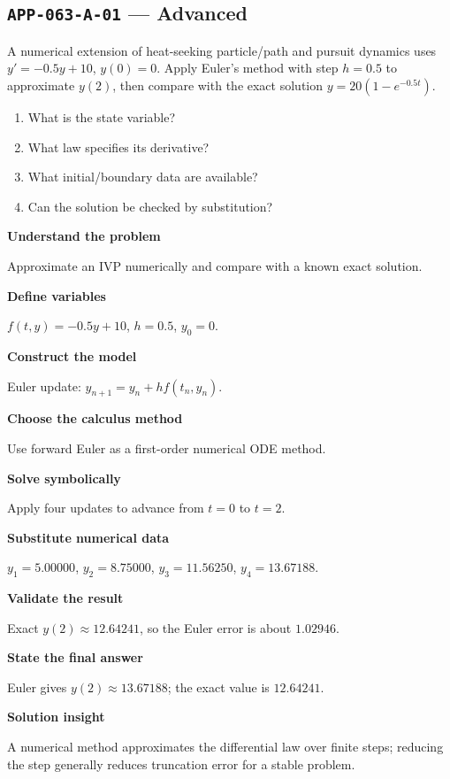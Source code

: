 \documentclass[11pt]{book}
\newcommand{\pid}[1]{\texttt{#1}}
\begin{document}
\subsection*{\pid{APP-063-A-01} — Advanced}
\begin{problembox}
A numerical extension of heat-seeking particle/path and pursuit dynamics uses $y'=-0.5y+10$, $y(0)=0$. Apply Euler's method with step $h=0.5$ to approximate $y(2)$, then compare with the exact solution $y=20(1-e^{-0.5t})$.
\end{problembox}
\begin{promptbox}\begin{enumerate}
\item What is the state variable?
\item What law specifies its derivative?
\item What initial/boundary data are available?
\item Can the solution be checked by substitution?
\end{enumerate}\end{promptbox}
\begin{solutionbox}
\textbf{Understand the problem}\par Approximate an IVP numerically and compare with a known exact solution.\par\medskip
\textbf{Define variables}\par $f(t,y)=-0.5y+10$, $h=0.5$, $y_0=0$.\par\medskip
\textbf{Construct the model}\par Euler update: $y_{n+1}=y_n+h f(t_n,y_n)$.\par\medskip
\textbf{Choose the calculus method}\par Use forward Euler as a first-order numerical ODE method.\par\medskip
\textbf{Solve symbolically}\par Apply four updates to advance from $t=0$ to $t=2$.\par\medskip
\textbf{Substitute numerical data}\par $y_1=5.00000$, $y_2=8.75000$, $y_3=11.56250$, $y_4=13.67188$.\par\medskip
\textbf{Validate the result}\par Exact $y(2)\approx 12.64241$, so the Euler error is about $1.02946$.\par\medskip
\textbf{State the final answer}\par Euler gives $y(2)\approx 13.67188$; the exact value is $12.64241$.\par\medskip
\textbf{Solution insight}\par A numerical method approximates the differential law over finite steps; reducing the step generally reduces truncation error for a stable problem.\par\medskip
\end{solutionbox}
\end{document}
